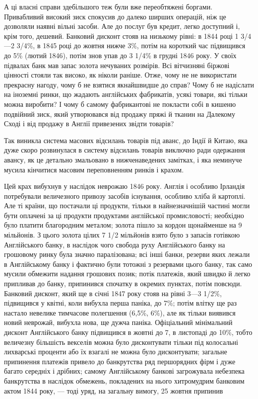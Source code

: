 А ці власні справи здебільшого теж були вже переобтяжені боргами. Привабливий високий зиск спокусив
до далеко
ширших операцій, ніж це дозволяли наявні вільні засоби. Але до
послуг був кредит, легко доступний і, крім того, дешевий. Банковий дисконт стояв на низькому рівні:
в 1844 році 1 3/4—2 3/4\%, в 1845 році до жовтня нижче 3\%, потім на короткий час підвищився до 5\%
(лютий 1846), потім знов упав до 3 1/4\% в грудні
1846 року. У своїх підвалах банк мав запас золота нечуваних
розмірів. Всі вітчизняні біржові цінності стояли так високо, як ніколи раніше. Отже, чому не не
використати прекрасну нагоду,
чому б не взятися якнайшвидше до справ? Чому б не надіслати
на іноземні ринки, що жадають англійських фабрикатів, усякі
товари, які тільки можна виробити? І чому б самому фабрикантові не покласти собі в кишеню подвійний
зиск, який утворювався від продажу пряжі й тканин на Далекому Сході і від
продажу в Англії привезених звідти товарів?

Так виникла система масових відсилань товарів під аванс, до
Індії й Китаю, яка дуже скоро розвинулася в систему відсилань
товарів виключно ради одержання авансу, як це детально змальовано в нижченаведених замітках, і яка
неминуче мусила кінчитися масовим переповненням ринків і крахом.

Цей крах вибухнув у наслідок неврожаю 1846 року. Англія
і особливо Ірландія потребували величезного привозу засобів
існування, особливо хліба й картоплі. Але ті країни, що постачали ці продукти, тільки в
найнезначнішій частині могли бути
оплачені за ці продукти продуктами англійської промисловості;
необхідно було платити благородним металом; золота пішло за
кордон щонайменше на 9 мільйонів. З цього золота цілих
7 1/2 мільйонів взято було з запасів готівкою Англійського банку,
в наслідок чого свобода руху Англійського банку на грошовому
ринку була значно паралізована; всі інші банки, резерви яких
лежали в Англійському банку і фактично були тотожні з резервами цього банку, так само мусили
обмежити надання грошових
позик; потік платежів, який швидко й легко припливав до банку,
припинився спочатку в окремих пунктах, потім повсюди. Банковий дисконт, який ще в січні 1847 року
стояв на рівні 3—3 1/2\%, підвищився у квітні, коли вибухла перша паніка, до 7\%; потім влітку
ще раз настало невелике тимчасове полегшення (6,5\%, 6\%), але
як тільки виявився новий неврожай, вибухла нова, ще дужча паніка. Офіціальний мінімальний дисконт
Англійського банку підвищився в жовтні до 7, в листопаді до 10\%, тобто величезну більшість векселів
можна було дисконтувати тільки під колосальні
лихварські проценти або їх взагалі не можна було дисконтувати;
загальне припинення платежів привело до банкрутства ряд першорядних фірм і дуже багато середніх і
дрібних; самому Англійському банкові загрожувала небезпека банкрутства в наслідок
обмежень, покладених на нього хитромудрим банковим актом
1844 року, — тоді уряд, на загальну вимогу, 25 жовтня припинив
\parbreak{}  %

